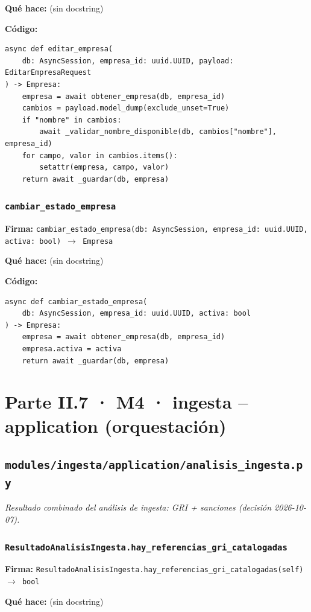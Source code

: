 \documentclass[11pt,a4paper]{article}
\begin{document}
\textbf{Qué hace:} (sin docstring)

\textbf{Código:}
\begin{lstlisting}
async def editar_empresa(
    db: AsyncSession, empresa_id: uuid.UUID, payload: EditarEmpresaRequest
) -> Empresa:
    empresa = await obtener_empresa(db, empresa_id)
    cambios = payload.model_dump(exclude_unset=True)
    if "nombre" in cambios:
        await _validar_nombre_disponible(db, cambios["nombre"], empresa_id)
    for campo, valor in cambios.items():
        setattr(empresa, campo, valor)
    return await _guardar(db, empresa)
\end{lstlisting}

\subsubsection*{\texttt{cambiar\_estado\_empresa}}
\textbf{Firma:} \texttt{cambiar\_estado\_empresa(db: AsyncSession, empresa\_id: uuid.UUID, activa: bool) $\rightarrow$ Empresa}

\textbf{Qué hace:} (sin docstring)

\textbf{Código:}
\begin{lstlisting}
async def cambiar_estado_empresa(
    db: AsyncSession, empresa_id: uuid.UUID, activa: bool
) -> Empresa:
    empresa = await obtener_empresa(db, empresa_id)
    empresa.activa = activa
    return await _guardar(db, empresa)
\end{lstlisting}

\section{Parte II.7 · M4 · ingesta -- application (orquestación)}
\subsection{\texttt{modules/ingesta/application/analisis\_ingesta.py}}
\textit{Resultado combinado del análisis de ingesta: GRI + sanciones (decisión 2026-10-07).}

\subsubsection*{\texttt{ResultadoAnalisisIngesta.hay\_referencias\_gri\_catalogadas}}
\textbf{Firma:} \texttt{ResultadoAnalisisIngesta.hay\_referencias\_gri\_catalogadas(self) $\rightarrow$ bool}

\textbf{Qué hace:} (sin docstring)
\end{document}
